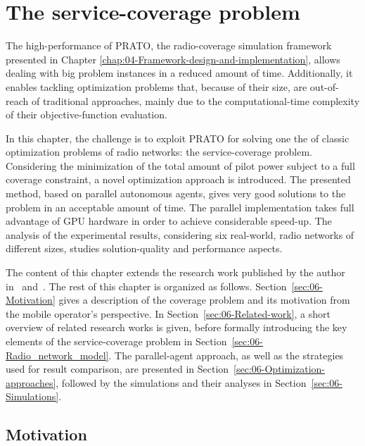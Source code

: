 
\chapter{The service-coverage problem \label{chap:06-Experimental-evaluation-the-service-coverage-problem}}


\noindent The high-performance of PRATO, the radio-coverage simulation
framework presented in Chapter \ref{chap:04-Framework-design-and-implementation},
allows dealing with big problem instances in a reduced amount of time.
Additionally, it enables tackling optimization problems that, because
of their size, are out-of-reach of traditional approaches, mainly
due to the computational-time complexity of their objective-function
evaluation.

In this chapter, the challenge is to exploit PRATO for solving one
the of classic optimization problems of radio networks: the service-coverage
problem. Considering the minimization of the total amount of pilot
power subject to a full coverage constraint, a novel optimization
approach is introduced. The presented method, based on parallel autonomous
agents, gives very good solutions to the problem in an acceptable
amount of time. The parallel implementation takes full advantage of
GPU hardware in order to achieve considerable speed-up. The analysis
of the experimental results, considering six real-world, radio networks
of different sizes, studies solution-quality and performance aspects.

The content of this chapter extends the research work published by
the author in~\cite{Benedicic_Pilot.power.optimization:2010} and~\cite{Benedicic-A_GPU_based_parallel_agent_optimization_approach:2013}.
The rest of this chapter is organized as follows. Section~\ref{sec:06-Motivation}
gives a description of the coverage problem and its motivation from
the mobile operator's perspective. In Section~\ref{sec:06-Related-work},
a short overview of related research works is given, before formally
introducing the key elements of the service-coverage problem in Section~\ref{sec:06-Radio_network_model}.
The parallel-agent approach, as well as the strategies used for result
comparison, are presented in Section~\ref{sec:06-Optimization-approaches},
followed by the simulations and their analyses in Section~\ref{sec:06-Simulations}.

\clearpage{}


\section{Motivation \label{sec:06-Motivation}}

